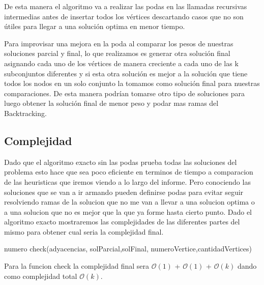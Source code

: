 De esta manera el algoritmo va a realizar las podas en las llamadas recursivas intermedias antes de insertar todos los vértices descartando casos que no son útiles para llegar  a una solución optima en menor tiempo.

Para improvisar una mejora en la poda al comparar los pesos de nuestras soluciones parcial y final, lo que realizamos es generar otra solución final asignando cada uno de los vértices de manera creciente a cada uno de las k subconjuntos diferentes y si esta otra solución es mejor a la solución que tiene todos los nodos en un solo conjunto la tomamos como solución final para nuestras comparaciones.
De esta manera podrían tomarse otro tipo de soluciones para luego obtener la solución final de menor peso y podar mas ramas del Backtracking.	

\subsection{Complejidad}
Dado que el algoritmo exacto sin las podas prueba todas las soluciones del problema esto hace que sea poco eficiente en terminos de tiempo a comparacion de las heuristicas que iremos viendo a lo largo del informe. Pero conociendo las soluciones que se van a ir armando pueden definirse podas para evitar seguir resolviendo ramas de la solucion que no me van a llevar a una solucion optima o a una solucion que no es mejor que la que ya forme hasta cierto punto.
Dado el algoritmo exacto mostraremos las complejidades de las diferentes partes del mismo para obtener cual seria la complejidad final.

\begin{algorithm}
  \begin{algorithmic}[1]\parskip=1mm
 \caption{numero check(adyacencias, solParcial,solFinal, numeroVertice,cantidadVertices)}
  \end{algorithmic}
  \end{algorithm}

Para la funcion check la complejidad final sera $\mathcal{O}(1)$ + $\mathcal{O}(1)$ + $\mathcal{O}(k)$ dando como complejidad total $\mathcal{O}(k)$.

